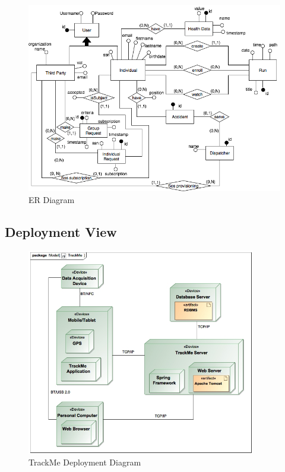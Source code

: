 \documentclass[a4paper]{article}
\begin{document}
\begin{figure}[!htpb]
    \centering
    \includegraphics[width=\textwidth,keepaspectratio]{DD/images/er_diagram.png}
    \caption{ER Diagram}
    \label{fig:ER_trackme}
\end{figure}

\newpage
\subsection{Deployment View}
\begin{figure}[!htpb]
    \centering
    \includegraphics[width=100mm,keepaspectratio]{images/UML/deployment_TrackMe.jpg}
    \caption{TrackMe Deployment Diagram}
    \label{fig:deployment_trackme}
\end{figure}    
    
\end{document}
